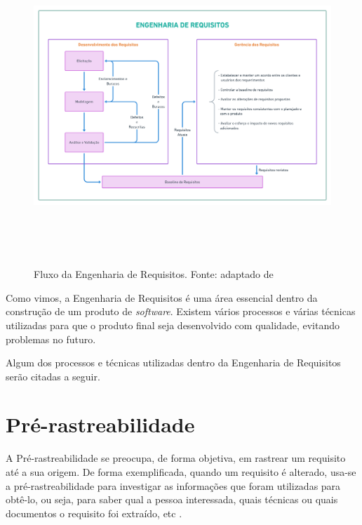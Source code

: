 \begin{itemize}
    \begin{figure}[htb]
        \begin{center}
            \includegraphics[width=12cm,height=12cm,keepaspectratio]{figuras/Introducao/eng_req_fluxo.png}
            \caption{{Fluxo da Engenharia de Requisitos. Fonte: adaptado de \cite{westfall_5w2h}}}
            \label{eng_req_flux}
        \end{center}
    \end{figure}
    
\end{itemize}

Como vimos, a Engenharia de Requisitos é uma área essencial dentro da construção de um produto de \textit{software}. Existem vários processos e várias técnicas utilizadas para que o produto final seja desenvolvido com qualidade, evitando problemas no futuro.

Algum dos processos e técnicas utilizadas dentro da Engenharia de Requisitos serão citadas a seguir.

\section{Pré-rastreabilidade}

A Pré-rastreabilidade se preocupa, de forma objetiva, em rastrear um requisito até a sua origem. De forma exemplificada, quando um requisito é alterado, usa-se a pré-rastreabilidade para investigar as informações que foram utilizadas para obtê-lo, ou seja, para saber qual a pessoa interessada, quais técnicas ou quais documentos o requisito foi extraído, etc \cite{pinheiro2004requirements}.

